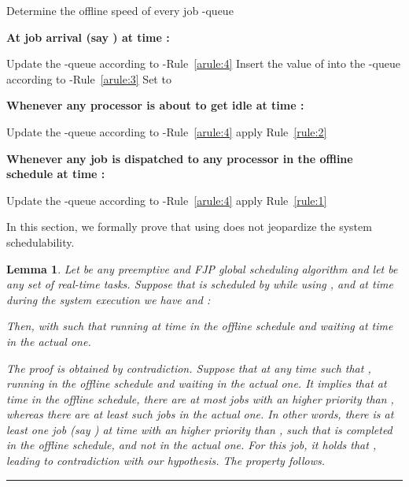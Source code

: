 \documentclass[times, 10pt,twocolumn]{article}
\newtheorem{Lemma}{Lemma}
\newenvironment{proof}[1][Proof]{\begin{trivlist}
\item[\hskip \labelsep {\bfseries #1}]}{\end{trivlist}}
\newcommand{\qed}{\rule{7pt}{7pt}}
\begin{document}
\incmargin{.2em} 
\linesnotnumbered
\begin{algorithm}[h!]
\begin{scriptsize}
\lnl{} Determine the offline speed  of every job  \;
\lnl{} -queue  \;
\vspace{0.2cm}

\textbf{At job arrival (say ) at time :} 

\Indp
\lnl{} Update the -queue according to -Rule~\ref{arule:4} \;
\lnl{} Insert the value of  into the -queue according to -Rule~\ref{arule:3} \;
\lnl{} Set  to  \;
\Indm
\vspace{0.2cm}

\textbf{Whenever any processor  is about to get idle at time :} 

\Indp
\lnl{} Update the -queue according to -Rule~\ref{arule:4} \;
\lnl{} apply Rule~\ref{rule:2} \;
\Indm
\vspace{0.2cm}

\textbf{Whenever any job  is dispatched to any processor  in the offline schedule at time :} 

\Indp
\lnl{} Update the -queue according to -Rule~\ref{arule:4} \;
\lnl{}  \;
\lnl{} apply Rule~\ref{rule:1} \;
\Indm
\caption{}
\label{algo:mora}
\end{scriptsize}
\end{algorithm}
\decmargin{.2em} 


\label{sec:proofs}

In this section, we formally prove that using  does not jeopardize the system schedulability.

\begin{Lemma}
\label{lem:wait_run}
Let  be any preemptive and FJP global scheduling algorithm and let  be any set of real-time tasks. Suppose that  is scheduled by  while using , and at time  during the system execution we have  and :

Then,  with  such that  running at time  in the offline schedule and waiting at time  in the actual one.
\begin{proof} 
The proof is obtained by contradiction. Suppose that at any time  such that ,  running in the offline schedule and waiting in the actual one. It implies that at time  in the offline schedule, there are at most  jobs with an higher priority than , whereas there are at least  such jobs in the actual one. In other words, there is at least one job (say ) at time  with an higher priority than , such that  is completed in the offline schedule, and not in the actual one. For this job, it holds that , leading to contradiction with our hypothesis. The property follows. \hfill \qed
\end{proof}
\end{Lemma}
\end{document}
